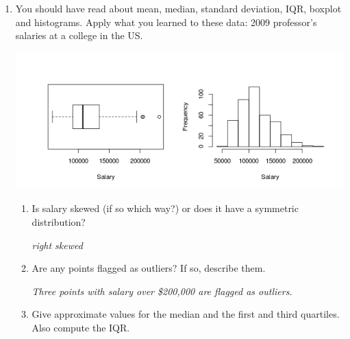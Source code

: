 \begin{enumerate}
\begin{key}
  {\it  Center is generally the easiest.  One could argue that spread
    is hard because you have to read the scales carefully, plus it
    depends on your amount of ambition for a good grade.  Skew is also
  hard because it require a close comparison of each tail. In this
  case, lots of A's are clearly preferred to an even spread or to more
D's.}
\end{key}



\item 
  You should have read about mean, median, standard deviation, IQR,
  boxplot and histograms.  Apply what you learned
  to these data:   2009 professor's salaries at a college in the US.

   \includegraphics[width=.8\linewidth]{plots/salaryBoxHist.png}
  \begin{enumerate}
    \item  Is salary skewed (if so which way?) or does it have a
      symmetric distribution? 
\begin{students}
    \vspace{1cm}    
\end{students}

\begin{key}
  {\it  right skewed}
\end{key}

    \item Are any points flagged as outliers?  If so, describe them. 
\begin{students}
    \vspace{1cm}    
\end{students}

\begin{key}
  {\it Three points with salary over \$200,000 are flagged as outliers.}
\end{key}
     \item  Give approximate values for the median and the first and
       third quartiles.  Also compute the IQR.
\begin{students}
    \vspace{1cm}    
\end{students}


\end{enumerate}
\end{enumerate}
